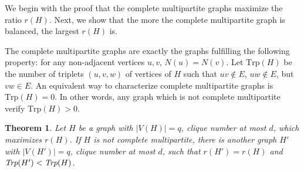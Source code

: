 \documentclass{article}
\newtheorem{theorem}{Theorem}
\newcommand{\card}[1]{\left| #1 \right|}
\newcommand{\trp}{\mbox{Trp}}
\begin{document}
We begin with the proof that the complete multipartite graphs maximize the ratio $r(H)$. Next, we show that the more the complete multipartite graph is balanced, the largest $r(H)$ is.

The complete multipartite graphs are exactly the graphs fulfilling the following property: for any non-adjacent vertices $u,v$, $N(u)=N(v)$. Let $\trp(H)$ be the number of triplets $(u,v,w)$ of vertices of $H$ such that $uv\notin E$, $uw \notin E$, but $vw \in E$. An equivalent way to characterize complete multipartite graphs is $\trp(H) = 0$. In other words, any graph which is not complete multipartite verify $\trp(H) > 0$. 

\begin{theorem}
Let $H$ be a graph with $\card{V(H)} = q$, clique number at most $d$, which maximizes $r(H)$. If $H$ is not complete multipartite, there is another graph $H'$ with $\card{V(H')} = q$, clique number at most $d$, such that $r(H') = r(H)$ and $\emph{Trp}(H') < \emph{Trp}(H)$. 
\label{th:complete_multi}
\end{theorem}
\end{document}
